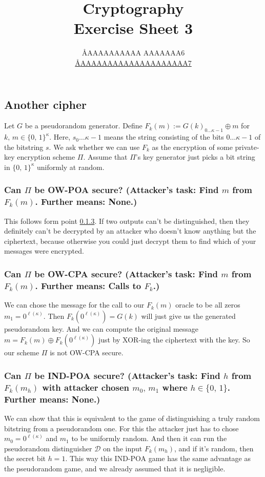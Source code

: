 \documentclass{article}
\title{Cryptography \\ Exercise Sheet 3}
\author{
  \AA{AAAAAAAAAA AAAAAAA}{6} \\
  \href{mailto:\AA{AAAAAAAAAAAAAAAAAAAA}{7}}{\AA{AAAAAAAAAAAAAAAAAAAA}{7}}
}
\begin{document}
  \maketitle

  \setcounter{section}{3}
  \subsection{Another cipher}
  \begin{centerframebox}
    Let $G$ be a pseudorandom generator. Define $F_k(m) := G(k)_{0\dots\kappa-1} \oplus m$ for
    $k,\, m \in \{0,\, 1\}^\kappa$.
    Here, $s_0 \dots \kappa-1$ means the string consisting of the bits $0 \dots \kappa-1$
    of the bitstring $s$. We ask whether we can use $F_k$ as the encryption of
    some private-key encryption scheme $\Pi$. Assume that $\Pi$'s key generator
    just picks a bit string in $\{0,\, 1\}^\kappa$
    uniformly at random.
  \end{centerframebox}
  \subsubsection{Can $\Pi$ be OW-POA secure? (Attacker's task: Find $m$ from $F_k(m)$. Further means: None.)}
  This follows form point \ref{sec:indpoasec}.
  If two outputs can't be distinguished, then they definitely can't be decrypted by an attacker who doesn't know anything but the ciphertext, because otherwise you could just decrypt them to find which of your messages were encrypted.

  \subsubsection{Can $\Pi$ be OW-CPA secure? (Attacker's task: Find $m$ from $F_k(m)$. Further means: Calls to $F_k$.)}
  We can chose the message for the call to our $F_k(m)$ oracle to be all zeros $m_1 = 0^{\ell(\kappa)}$.
  Then $F_k\left(0^{\ell(\kappa)}\right) = G(k)$ will just give us the generated pseudorandom key.
  And we can compute the original message $m = F_k(m) \oplus F_k\left(0^{\ell(\kappa)}\right)$ just by XOR-ing the ciphertext with the key.
  So our scheme $\Pi$ is not OW-CPA secure.

  \subsubsection{Can $\Pi$ be IND-POA secure? (Attacker's task: Find $h$ from $F_k(m_h)$ with attacker chosen $m_0,\, m_1$ where $h \in \{0,\, 1\}$. Further means: None.)}
  \label{sec:indpoasec}
  We can show that this is equivalent to the game of distinguishing a truly random bitstring from a pseudorandom one.
  For this the attacker just has to chose $m_0 = 0^{\ell(\kappa)}$ and $m_1$ to be uniformly random.
  And then it can run the pseudorandom distinguisher $\mathcal{D}$ on the input $F_k(m_h)$,
  and if it's random, then the secret bit $h = 1$.
  This way this IND-POA game has the same advantage as the pseudorandom game, and we already assumed that it is negligible.
\end{document}
